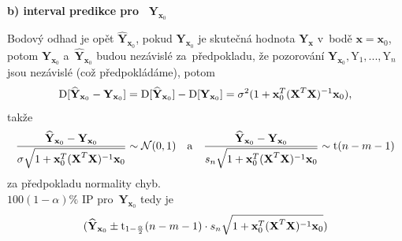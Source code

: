 \textbf{ b) interval predikce pro~} $\textbf{Y}_{\textbf{x}_0}$

Bodový odhad je opět $\widehat{\textbf{Y}}_{\textbf{x}_0}$, pokud $\textbf{Y}_{\textbf{x}_0}$ je skutečná hodnota $\textbf{Y}_{\textbf{x}}$ v~bodě $\textbf{x} = \textbf{x}_0$, potom $\textbf{Y}_{\textbf{x}_0}$ a~$\widehat{\textbf{Y}}_{\textbf{x}_0}$ budou nezávislé za~předpokladu, že pozorování $\textbf{Y}_{\textbf{x}_0}, \text{Y}_1,..., \text{Y}_n$ jsou nezávislé (což předpokládáme),
potom
 $$
\mathrm{D} [\widehat{\textbf{Y}}_{\textbf{x}_0} - \textbf{Y}_{\textbf{x}_0}] = \mathrm{D} [\widehat{\textbf{Y}}_{\textbf{x}_0}] - \mathrm{D} [\textbf{Y}_{\textbf{x}_0}] = \sigma^2(1+ \textbf{x}_0^T(\textbf{X}^T \textbf{X})^{-1} \textbf{x}_0),
 $$
takže
 $$
\frac{\widehat{\textbf{Y}}_{\textbf{x}_0} - \textbf{Y}_{\textbf{x}_0}}{\sigma \sqrt{1+ \textbf{x}_0^T(\textbf{X}^T \textbf{X})^{-1} \textbf{x}_0 }} \sim \mathcal{N}(0,1) \quad \text{a} \quad \frac{\widehat{\textbf{Y}}_{\textbf{x}_0} - \textbf{Y}_{\textbf{x}_0}}{s_n \sqrt{1+ \textbf{x}_0^T(\textbf{X}^T \textbf{X})^{-1} \textbf{x}_0 }} \sim \mathrm{t}(n-m-1)
 $$
za předpokladu normality chyb. \\
 $100(1-\alpha) \%$ IP pro~$\textbf{Y}_{\textbf{x}_0}$ tedy je
 $$
 (\widehat{\textbf{Y}}_{\textbf{x}_0} \pm \mathrm{t}_{1 - \frac{\alpha}{2}}(n-m-1) \cdot s_n \sqrt{1+ \textbf{x}_0^T(\textbf{X}^T \textbf{X})^{-1} \textbf{x}_0 })
 $$
